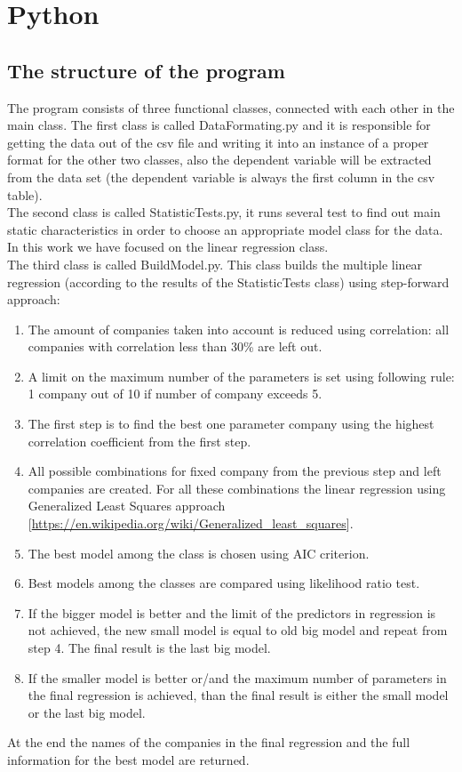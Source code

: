 \documentclass{article}
\begin{document}
\section{Python}
\subsection{The structure of the program}
The program consists of three functional classes, connected with each other in the main class. The first class is called DataFormating.py and it is responsible for getting the data out of the csv file and writing it into an instance of a proper format for the other two classes, also the dependent variable will be extracted from the data set (the dependent variable is always the first column in the csv table).\\
The second class is called StatisticTests.py, it runs several test to find out main static characteristics in order to choose an appropriate model class for the data. In this work we have focused on the linear regression class.\\
The third class is called BuildModel.py. This class builds the multiple linear regression (according to the results of the StatisticTests class) using step-forward approach:
\begin{enumerate}
    \item The amount of companies taken into account is reduced using correlation: all companies with correlation less than 30\% are left out.
    \item A limit on the maximum number of the parameters is set using following rule: 1 company out of 10 if number of company exceeds 5.
    \item The first step is to find the best one parameter company using the highest correlation coefficient from the first step.
    \item All possible combinations for fixed company from the previous step and left companies are created. For all these combinations the linear regression using Generalized Least Squares approach [\url{https://en.wikipedia.org/wiki/Generalized_least_squares}].
    \item The best model among the class is chosen using AIC criterion.
    \item Best models among the classes are compared using likelihood ratio test. 
    \item If the bigger model is better and the limit of the predictors in regression is not achieved, the new small model is equal to old big model and repeat from step 4. The final result is the last big model.
    \item If the smaller model is better or/and the maximum number of parameters in the final regression is achieved, than the final result is either the small model or the last big model. 
\end{enumerate} 
At the end the names of the companies in the final regression and the full information for the best model are returned.
\end{document}
